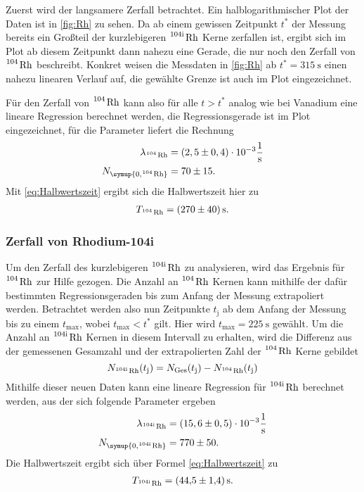 Zuerst wird der langsamere Zerfall betrachtet. Ein halblogarithmischer Plot der Daten ist in \autoref{fig:Rh} zu sehen.
Da ab einem gewissen Zeitpunkt $t^*$ der Messung bereits ein
Großteil der kurzlebigeren $\ce{^{104\text{i}} Rh}$ Kerne zerfallen ist, ergibt sich im Plot ab diesem Zeitpunkt
dann nahezu eine Gerade, die nur noch den Zerfall von $\ce{^104 Rh}$ beschreibt.
Konkret weisen die Messdaten in \autoref{fig:Rh} ab $t^*=\qty{315}{\second}$ einen nahezu linearen Verlauf auf,
die gewählte Grenze ist auch im Plot eingezeichnet.

Für den Zerfall von $\ce{^104 Rh}$ kann also für alle $t>t^*$ analog wie bei Vanadium eine lineare Regression
berechnet werden, die Regressionsgerade ist im Plot eingezeichnet, für die Parameter liefert die Rechnung
\begin{align*}
  \lambda_{\ce{^104 Rh}} &= (2,5 \pm 0,4) \cdot 10^{-3} \unit{\per\second} \\
  N_{\symup{0, \ce{^104 Rh}}} &= 70 \pm 15.
\end{align*}
Mit \eqref{eq:Halbwertszeit} ergibt sich die Halbwertszeit hier zu
\begin{gather*}
  T_{\ce{^104 Rh}} = \qty{270+-40}{\second}.
\end{gather*}

\subsubsection{Zerfall von Rhodium-104i}

Um den Zerfall des kurzlebigeren $\ce{^{104\text{i}} Rh}$ zu analysieren, wird das Ergebnis für $\ce{^104 Rh}$
zur Hilfe gezogen.
Die Anzahl an $\ce{^104 Rh}$ Kernen kann mithilfe der dafür bestimmten Regressionsgeraden bis zum Anfang
der Messung extrapoliert werden. Betrachtet werden also nun Zeitpunkte $t_{\text{j}}$ ab dem Anfang der
Messung bis zu einem $t_{\text{max}}$, wobei $t_{\text{max}}<t^*$ gilt.
Hier wird $t_{\text{max}}=\qty{225}{\second}$ gewählt.
Um die Anzahl an $\ce{^{104\text{i}} Rh}$ Kernen in diesem Intervall zu erhalten, wird die Differenz
aus der gemessenen Gesamzahl und der extrapolierten Zahl der $\ce{^104 Rh}$ Kerne gebildet
\begin{equation*}
  N_{\ce{^{104\text{i}} Rh}}(t_{\text{j}}) = N_{\text{Ges}}(t_{\text{j}}) - N_{\ce{^104 Rh}}(t_{\text{j}})
\end{equation*}
Mithilfe dieser neuen Daten kann eine lineare Regression für $\ce{^{104\text{i}} Rh}$ berechnet werden,
aus der sich folgende Parameter ergeben
\begin{align*}
  \lambda_{\ce{^{104\text{i}} Rh}} &= (15,6 \pm 0,5) \cdot 10^{-3} \unit{\per\second} \\
  N_{\symup{0, \ce{^{104\text{i}} Rh}}} &= 770 \pm 50.
\end{align*}
Die Halbwertszeit ergibt sich über Formel \eqref{eq:Halbwertszeit} zu
\begin{gather*}
  T_{\ce{^{104\text{i}} Rh}} = \qty{44.5+-1.4}{\second}.
\end{gather*}

